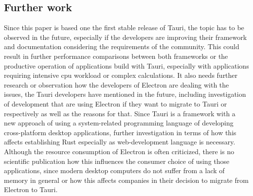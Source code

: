 \subsection{Further work}
Since this paper is based one the first stable release of Tauri, the topic has to be observed in the future, especially if the developers are improving their framework and documentation considering the requirements of the community.
This could result in further performance comparisons between both frameworks or the productive operation of applications build with Tauri, especially with applications requiring intensive cpu workload or complex calculations.
It also needs further research or observation how the developers of Electron are dealing with the issues, the Tauri developers have mentioned in the future, including investigation of development that are using Electron if
they want to migrate to Tauri or respectively as well as the reasons for that.
Since Tauri is a framework with a new approach of using a system-related programming language of developing cross-platform desktop applications, further investigation in terms of how this affects establishing Rust especially as web-development language is necessary.
Although the resource consumption of Electron is often criticized, there is no scientific publication how this influences the consumer choice of using those applications, since modern desktop computers do not suffer from a lack of memory in general
or how this affects companies in their decision to migrate from Electron to Tauri.



